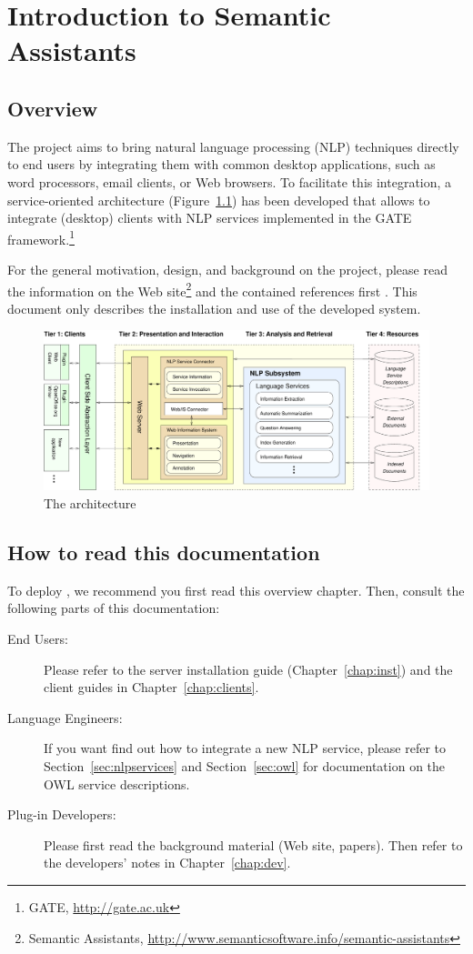  
\chapter{Introduction to Semantic Assistants}

\section{Overview}
The \sa project aims to bring natural language processing (NLP)
techniques directly to end users by integrating them with common
desktop applications, such as word processors, email clients, or Web
browsers. To facilitate this integration, a service-oriented
architecture (Figure~\ref{fig:arch}) has been developed that allows to
integrate (desktop) clients with NLP services implemented in the GATE
framework.\footnote{GATE, \url{http://gate.ac.uk}} 

For the general motivation, design, and background on the \sa project,
please read the information on the \sa Web site\footnote{Semantic
  Assistants,
  \url{http://www.semanticsoftware.info/semantic-assistants}} and the
contained references first \citep{giwi08,aswc08}. This document only
describes the installation and use of the developed system.

\begin{figure}[t]
  \centering
  \includegraphics[width=\textwidth]{pictures/arch}
  \caption{The \sa architecture}
  \label{fig:arch}
\end{figure}

\section{How to read this documentation}
To deploy \sa, we recommend you first read this overview chapter.
Then, consult the following parts of this documentation:

\begin{description}
\item[End Users:] Please refer to the server installation guide
  (Chapter~\ref{chap:inst}) and the client guides in
  Chapter~\ref{chap:clients}.

\item[Language Engineers:] If you want find out how to integrate a new
  NLP service, please refer to Section~\ref{sec:nlpservices} and
  Section~\ref{sec:owl} for documentation on the OWL service
  descriptions.

\item[Plug-in Developers:] Please first read the background material
  (Web site, papers). Then refer to the developers' notes in
  Chapter~\ref{chap:dev}.
\end{description}

